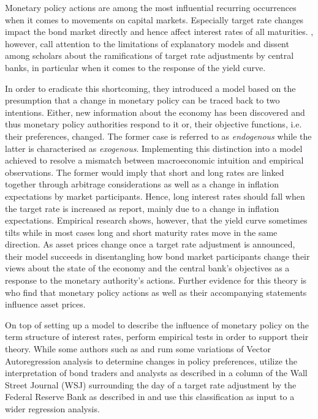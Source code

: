 
Monetary policy actions are among the most influential recurring occurrences when it comes to movements on capital markets. Especially target rate changes impact the bond market directly and hence affect interest rates of all maturities. \textcite{Ellingsen.2001}, however, call attention to the limitations of explanatory models and dissent among scholars about the ramifications of target rate adjustments by central banks, in particular when it comes to the response of the yield curve. 

In order to eradicate this shortcoming, they introduced a model based on the presumption that a change in monetary policy can be traced back to two intentions. Either, new information about the economy has been discovered and thus monetary policy authorities respond to it or, their objective functions, i.e. their preferences, changed. The former case is referred to as \textit{endogenous} while the latter is characterised as \textit{exogenous}.
Implementing this distinction into a model achieved to resolve a mismatch between macroeconomic intuition and empirical observations. The former would imply that short and long rates are linked together through arbitrage considerations as well as a change in inflation expectations by market participants. Hence, long interest rates should fall when the target rate is increased as \textcite{Ellingsen.2003} report, mainly due to a change in inflation expectations. Empirical research shows, however, that the yield curve sometimes tilts while in most cases long and short maturity rates move in the same direction. As asset prices change once a target rate adjustment is announced, their model succeeds in disentangling how bond market participants change their views about the state of the economy and the central bank's objectives as a response to the monetary authority's actions. Further evidence for this theory is \textcite{Gurkaynak.2004} who find that monetary policy actions as well as their accompanying statements influence asset prices.

On top of setting up a model to describe the influence of monetary policy on the term structure of interest rates, \textcite{Ellingsen.2001} perform empirical tests in order to support their theory. While some authors such as \textcite{Peersman.2002} and \textcite{Evans.1998} rum some variations of Vector Autoregression analysis to determine changes in policy preferences, \textcite{Ellingsen.2001} utilize the interpretation of bond traders and analysts as described in a column of the Wall Street Journal (WSJ) surrounding the day of a target rate adjustment by the Federal Reserve Bank as described in \textcite{Ellingsen.2003} and use this classification as input to a wider regression analysis.

